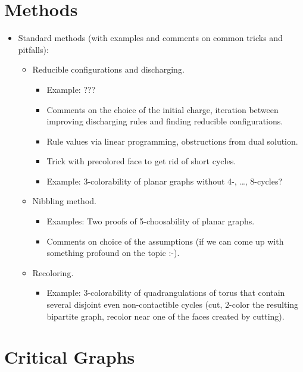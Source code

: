 \documentclass[12pt,twoside,openright,a4paper]{book}
\begin{document}
\chapter{Methods}
\begin{itemize}
\item Standard methods (with examples and comments on common tricks and pitfalls):
\begin{itemize}
\item Reducible configurations and discharging.
\begin{itemize}
\item Example: ???
\item Comments on the choice of the initial charge, iteration between improving discharging rules and finding reducible configurations.
\item Rule values via linear programming, obstructions from dual solution.
\item Trick with precolored face to get rid of short cycles.
\item Example: 3-colorability of planar graphs without 4-, \ldots, 8-cycles?
\end{itemize}
\item Nibbling method.
\begin{itemize}
\item Examples: Two proofs of 5-choosability of planar graphs.
\item Comments on choice of the assumptions (if we can come up with something profound on the topic :-).
\end{itemize}
\item Recoloring.
\begin{itemize}
\item Example: 3-colorability of quadrangulations of torus that contain several disjoint even non-contactible cycles
(cut, $2$-color the resulting bipartite graph, recolor near one of the faces created by cutting).
\end{itemize}
\end{itemize}
\end{itemize}
% 

\chapter{Critical Graphs}
\end{document}
